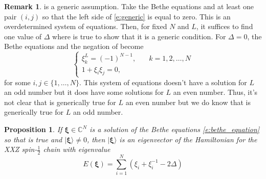 \documentclass[a4paper,11pt]{article}
\newtheorem{proposition}[theorem]{Proposition}
\theoremstyle{definition}
\newtheorem{remark}[theorem]{Remark}
\begin{document}
\begin{remark}
     is a generic assumption. Take the Bethe equations and at least one pair $(i,j)$ so that the left side of \eqref{e:generic} is equal to zero. This is an overdetermined system of equations. Then, for fixed $N$ and $L$, it suffices to find one value of $\Delta$ where  is true to show that it is a generic condition. For $\Delta =0$, the Bethe equations and the negation of  become
    \begin{equation}
        \begin{cases}
            \xi_k^L = (-1)^{N-1}, &\quad k=1, 2, \dots, N\\
            1 + \xi_i \xi_j = 0,
        \end{cases}
    \end{equation}
    for some $i, j \in \{1, \dots, N\}$. This system of equations doesn't have a solution for $L$ an odd number but it does have some solutions for $L$ an even number. Thus, it's not clear that  is generically true for $L$ an even number but we do know that  is generically true for $L$ an odd number.  
\end{remark}

\begin{proposition}\label{p:eigenvector}
If $\mathbf{\boldsymbol{\xi}} \in \mathbb{C}^N$ is a solution of the Bethe equations \eqref{e:bethe_equation} so that  is true and $| \mathbf{\boldsymbol{\xi}} \rangle \neq0$, then $| \mathbf{\boldsymbol{\xi}} \rangle$ is an eigenvector of the Hamiltonian for the XXZ spin-$\tfrac{1}{2}$ chain with eigenvalue
\begin{equation}\label{e:eigenvalue}
    E(\mathbf{\boldsymbol{\xi}}) = \sum_{i=1}^N \left(\xi_i + \xi_i^{-1} - 2\Delta \right)
\end{equation}
\end{proposition}
\end{document}
